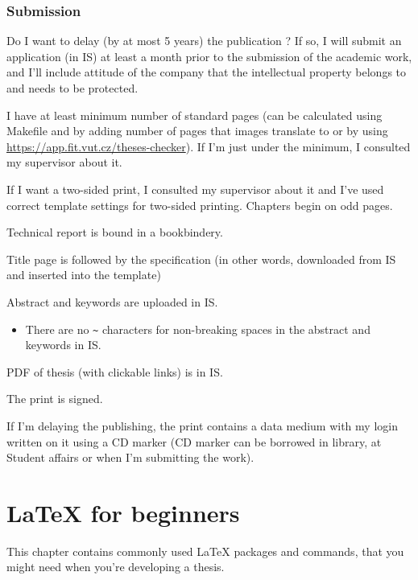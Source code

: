 \subsection*{Submission}
\begin{checklist}
	\item Do I want to delay (by at most 5 years) the publication ? If so, I will submit an application (in IS) at least a month prior to the submission of the academic work, and I'll include attitude of the company that the intellectual property belongs to and needs to be protected.
    \item I have at least minimum number of standard pages (can be calculated using Makefile and by adding number of pages that images translate to or by using \url{https://app.fit.vut.cz/theses-checker}). If I'm just under the minimum, I consulted my supervisor about it.
   	\item If I want a two-sided print, I consulted my supervisor about it and I've used correct template settings for two-sided printing. Chapters begin on odd pages.
    \item Technical report is bound in a bookbindery.
    \item Title page is followed by the specification (in other words, downloaded from IS and inserted into the template)
    \item Abstract and keywords are uploaded in IS.
      \begin{itemize}
        \item There are no \verb|~| characters for non-breaking spaces in the abstract and keywords in IS.
      \end{itemize}     
    \item PDF of thesis (with clickable links) is in IS.
    \item The print is signed.
    \item If I'm delaying the publishing, the print contains a data medium with my login written on it using a CD marker (CD marker can be borrowed in library, at Student affairs or when I'm submitting the work).
\end{checklist}

\chapter{\LaTeX{} for beginners}
\label{latex}

This chapter contains commonly used \LaTeX{} packages and commands, that you might need when you're developing a thesis.

